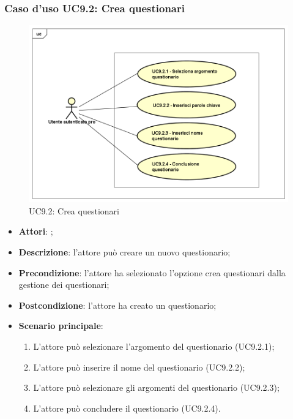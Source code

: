 	\subsubsection{Caso d'uso UC9.2: Crea questionari}
	\label{UC9.2}
	\begin{figure}[h]
		\centering
	\includegraphics[scale=0.5,keepaspectratio]{UML/UC9_2.png}
		\caption{UC9.2: Crea questionari}
	\end{figure}
	\FloatBarrier
	\begin{itemize}
		\item \textbf{Attori}: \uaupro{};
		\item \textbf{Descrizione}: l'attore può creare un nuovo questionario; 
		\item \textbf{Precondizione}: l'attore ha selezionato l'opzione crea questionari dalla gestione dei questionari;
		\item \textbf{Postcondizione}: l'attore ha creato un questionario;
		\item \textbf{Scenario principale}:
			\begin{enumerate}
				\item L'attore può selezionare l'argomento del questionario (UC9.2.1);
				\item L'attore può inserire il nome del questionario (UC9.2.2);
				\item L'attore può selezionare gli argomenti del questionario (UC9.2.3);
				\item L'attore può concludere il questionario (UC9.2.4).
			\end{enumerate}
		\end{itemize}
	
